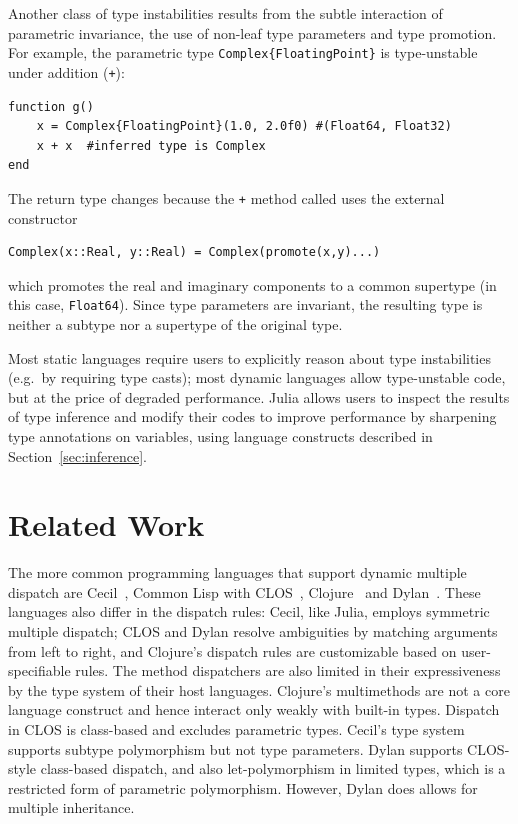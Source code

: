 \documentclass[10pt, preprint]{sigplanconf}
\begin{document}
Another class of type instabilities results from the subtle interaction of
parametric invariance, the use of non-leaf type parameters and type promotion.
For example, the parametric type \verb|Complex{FloatingPoint}| is
type-unstable under addition (\verb|+|):

\begin{lstlisting}
function g()
    x = Complex{FloatingPoint}(1.0, 2.0f0) #(Float64, Float32)
    x + x  #inferred type is Complex
end
\end{lstlisting}
%
The return type changes because the \verb|+| method called uses the external
constructor

\begin{lstlisting}
Complex(x::Real, y::Real) = Complex(promote(x,y)...)
\end{lstlisting}
%
which promotes the real and imaginary components to a common supertype (in this
case, \verb|Float64|). Since type parameters are invariant, the resulting type
is neither a subtype nor a supertype of the original type.

Most static languages require users to explicitly reason about type
instabilities (e.g.\ by requiring type casts); most dynamic languages allow
type-unstable code, but at the price of degraded performance. Julia allows
users to inspect the results of type inference and modify their codes to
improve performance by sharpening type annotations on variables, using language
constructs described in Section~\ref{sec:inference}.


\section{Related Work}

The more common programming languages that support dynamic multiple dispatch
are Cecil~\cite{Chambers1992,Chambers1994}, Common Lisp with
CLOS~\cite{Bobrow1988}, Clojure~\cite{Hickey2008} and Dylan~\cite{dylanman}.
These languages also differ in the dispatch rules: Cecil, like Julia, employs
symmetric multiple dispatch; CLOS and Dylan resolve ambiguities by matching
arguments from left to right, and Clojure's dispatch rules are
customizable based on user-specifiable rules. The method dispatchers are also
limited in their expressiveness by the type system of their host languages.
Clojure's multimethods are not a core language construct and hence interact
only weakly with built-in types. Dispatch in CLOS is class-based and excludes
parametric types. Cecil's type system supports subtype polymorphism but not
type parameters. Dylan supports CLOS-style class-based dispatch, and also
let-polymorphism in limited types, which is a restricted form of parametric
polymorphism. However, Dylan does allows for multiple inheritance.
\end{document}
